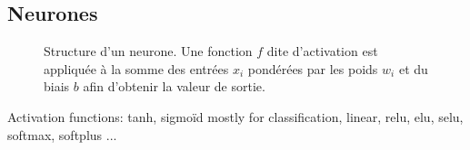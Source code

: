 \subsection{Neurones}\label{chapter-ML-section-DNN-neuron}

\begin{figure}[h]
\centering

\caption[Structure d'un neurone.]{Structure d'un neurone. Une fonction $f$ dite d'\og activation \fg{} est appliquée à la somme des entrées $x_i$ pondérées par les poids $w_i$ et du biais $b$ afin d'obtenir la valeur de sortie.}
\label{fig-chapter-ML-section-DNN-neuron-neuron_structure}
\end{figure}



Activation functions:
tanh, sigmoïd mostly for classification,
linear, relu, elu, selu, softmax, softplus ...